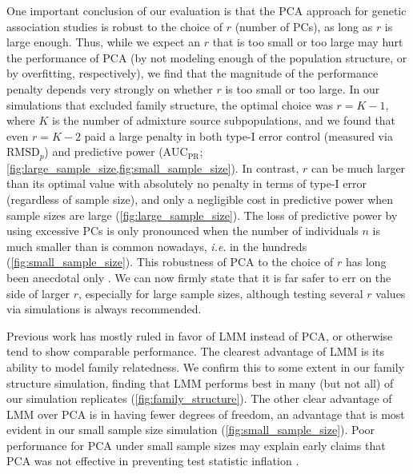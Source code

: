 \documentclass[11pt]{article}
\newcommand{\rmsd}{\text{RMSD}_p}
\newcommand{\auc}{\text{AUC}_\text{PR}}
\begin{document}




One important conclusion of our evaluation is that the PCA approach for genetic association studies is robust to the choice of $r$ (number of PCs), as long as $r$ is large enough.
Thus, while we expect an $r$ that is too small or too large may hurt the performance of PCA (by not modeling enough of the population structure, or by overfitting, respectively), we find that the magnitude of the performance penalty depends very strongly on whether $r$ is too small or too large.
In our simulations that excluded family structure, the optimal choice was $r = K-1$, where $K$ is the number of admixture source subpopulations, and we found that even $r = K-2$ paid a large penalty in both type-I error control (measured via $\rmsd$) and predictive power ($\auc$; \cref{fig:large_sample_size,fig:small_sample_size}).
In contrast, $r$ can be much larger than its optimal value with absolutely no penalty in terms of type-I error (regardless of sample size), and only a negligible cost in predictive power when sample sizes are large (\cref{fig:large_sample_size}).
The loss of predictive power by using excessive PCs is only pronounced when the number of individuals $n$ is much smaller than is common nowadays, \textit{i.e}. in the hundreds (\cref{fig:small_sample_size}).
This robustness of PCA to the choice of $r$ has long been anecdotal only \citep{price_principal_2006, kang_variance_2010}.
We can now firmly state that it is far safer to err on the side of larger $r$, especially for large sample sizes, although testing several $r$ values via simulations is always recommended.

Previous work has mostly ruled in favor of LMM instead of PCA, or otherwise tend to show comparable performance.
The clearest advantage of LMM is its ability to model family relatedness.
We confirm this to some extent in our family structure simulation, finding that LMM performs best in many (but not all) of our simulation replicates (\cref{fig:family_structure}).
The other clear advantage of LMM over PCA is in having fewer degrees of freedom, an advantage that is most evident in our small sample size simulation (\cref{fig:small_sample_size}).
Poor performance for PCA under small sample sizes may explain early claims that PCA was not effective in preventing test statistic inflation \citep{epstein_simple_2007, kimmel_randomization_2007, luca_use_2008}.
\end{document}
